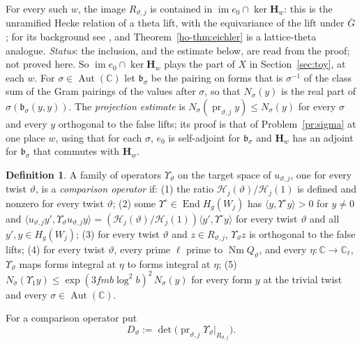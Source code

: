 \documentclass[reqno]{amsart}
\theoremstyle{definition}
\newtheorem{definition}{Definition}[section]
\theoremstyle{plain}
\theoremstyle{remark}
\newcommand{\C}{{\mathbb{C}}}
\newcommand{\Hc}{{\mathcal{H}}}
\newcommand{\Hb}{{\mathbf{H}}}
\newcommand{\pr}{\operatorname{pr}}
\newcommand{\im}{\operatorname{im}}
\newcommand{\End}{\operatorname{End}}
\newcommand{\Aut}{\operatorname{Aut}}
\newcommand{\Nm}{\operatorname{Nm}}
\begin{document}
For every such \(w\), the image \(R_{\vartheta,j}\) is contained in \(\im e_0 \cap \ker \Hb_w\): this is the unramified Hecke relation of a theta lift, with the equivariance of the lift under \(\bar G\); for its background see \cite{Ra82}, and Theorem~\ref{ho-thm:eichler} is a lattice-theta analogue.  \emph{Status}: the inclusion, and the estimate below, are read from the proof; not proved here.  So \(\im e_0 \cap \ker\Hb_w\) plays the part of \(X\) in Section~\ref{sec:toy}, at each \(w\).  For \(\sigma \in \Aut(\C)\) let \(\mathfrak b_\sigma\) be the pairing on forms that is \(\sigma^{-1}\) of the class sum of the Gram pairings of the values after \(\sigma\), so that \(N_\sigma(y)\) is the real part of \(\sigma(\mathfrak b_\sigma(y,y))\).  The \emph{projection estimate} is \(N_\sigma(\pr_{\vartheta,j}y) \le N_\sigma(y)\) for every \(\sigma\) and every \(y\) orthogonal to the false lifts; its proof is that of Problem~\ref{pr:sigma} at one place \(w\), using that for each \(\sigma\), \(e_0\) is self-adjoint for \(\mathfrak b_\sigma\) and \(\Hb_w\) has an adjoint for \(\mathfrak b_\sigma\) that commutes with \(\Hb_w\).

\begin{definition}\label{def:comparison}
A family of operators \(\Upsilon_\vartheta\) on the target space of \(u_{\vartheta,j}\), one for every twist \(\vartheta\), is a \emph{comparison operator} if:
(1) the ratio \(\Hc_j(\vartheta)/\Hc_j(1)\) is defined and nonzero for every twist \(\vartheta\);
(2) some \(\Upsilon^\circ \in \End H_g(W_j)\) has \(\langle y, \Upsilon^\circ y\rangle > 0\) for \(y \ne 0\) and \(\langle u_{\vartheta,j}y', \Upsilon_\vartheta u_{\vartheta,j}y\rangle = (\Hc_j(\vartheta)/\Hc_j(1))\langle y', \Upsilon^\circ y\rangle\) for every twist \(\vartheta\) and all \(y', y \in H_g(W_j)\);
(3) for every twist \(\vartheta\) and \(z \in R_{\vartheta,j}\), \(\Upsilon_\vartheta z\) is orthogonal to the false lifts;
(4) for every twist \(\vartheta\), every prime \(\ell\) prime to \(\Nm Q_\vartheta\), and every \(\eta \colon \C \to \C_\ell\), \(\Upsilon_\vartheta\) maps forms integral at \(\eta\) to forms integral at \(\eta\);
(5) \(N_\sigma(\Upsilon_1 y) \le \exp(3fmb\log^2 b)^2\, N_\sigma(y)\) for every form \(y\) at the trivial twist and every \(\sigma \in \Aut(\C)\).
\end{definition}

For a comparison operator put
\begin{equation}\label{eq:D}
  D_\vartheta := \det\bigl(\pr_{\vartheta,j}\Upsilon_\vartheta|_{R_{\vartheta,j}}\bigr) .
\end{equation}
\end{document}
